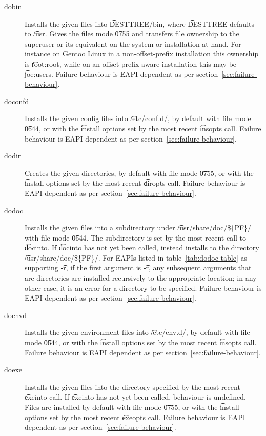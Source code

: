 \begin{description}
\item[dobin] Installs the given files into \t{DESTTREE/bin}, where
    \t{DESTTREE} defaults to \t{/usr}. Gives the files mode \t{0755}
    and transfers file ownership to the superuser or its equivalent on
    the system or installation at hand. For instance on Gentoo Linux in
    a non-offset-prefix installation this ownership is \t{root:root},
    while on an offset-prefix aware installation this may be
    \t{joe:users}. Failure behaviour is EAPI dependent as per
    section~\ref{sec:failure-behaviour}.

\item[doconfd] Installs the given config files into \t{/etc/conf.d/}, by default with file mode
    \t{0644}, or with the \t{install} options set by the most recent \t{insopts} call.
    Failure behaviour is EAPI dependent as per section~\ref{sec:failure-behaviour}.

\item[dodir] Creates the given directories, by default with file mode \t{0755}, or with the
    \t{install} options set by the most recent \t{diropts} call. Failure behaviour is EAPI
    dependent as per section~\ref{sec:failure-behaviour}.

\item[dodoc]  Installs the given files into a subdirectory under
    \t{/usr/share/doc/\$\{PF\}/} with file mode \t{0644}. The subdirectory is set by the most recent
    call to \t{docinto}. If \t{docinto} has not yet been called, instead installs to the directory
    \t{/usr/share/doc/\$\{PF\}/}. For EAPIs listed in table~\ref{tab:dodoc-table} as supporting \t{-r},
    if the first argument is \t{-r}, any subsequent arguments that are directories are installed
    recursively to the appropriate location; in any other case, it is an error for a directory to be
    specified. Failure behaviour is EAPI dependent as per section~\ref{sec:failure-behaviour}.

\item[doenvd] Installs the given environment files into \t{/etc/env.d/}, by default with file mode
    \t{0644}, or with the \t{install} options set by the most recent \t{insopts} call.
    Failure behaviour is EAPI dependent as per section~\ref{sec:failure-behaviour}.

\item[doexe] Installs the given files into the directory specified by the most recent \t{exeinto}
    call. If \t{exeinto} has not yet been called, behaviour is undefined. Files are installed by
    default with file mode \t{0755}, or with the \t{install} options set by the most recent
    \t{exeopts} call.
    Failure behaviour is EAPI dependent as per section~\ref{sec:failure-behaviour}.


\end{description}
